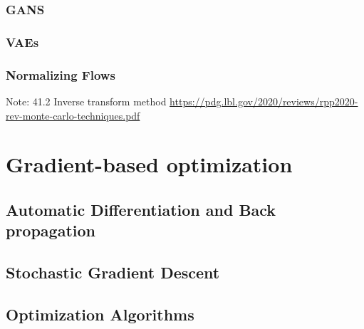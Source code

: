 \subsubsection{GANS}\label{ML:sec:gan}



\subsubsection{VAEs}\label{ML:sec:vae}



\subsubsection{Normalizing Flows}\label{ML:sec:flows}

Note: 41.2 Inverse transform method \url{https://pdg.lbl.gov/2020/reviews/rpp2020-rev-monte-carlo-techniques.pdf}


\section{Gradient-based optimization}\label{ML:sec:grad_opt}

\subsection{Automatic Differentiation and Back propagation}\label{ML:sec:autodiff}

\subsection{Stochastic Gradient Descent}\label{ML:sec:sgd}


\subsection{Optimization Algorithms}\label{ML:sec:opt}



